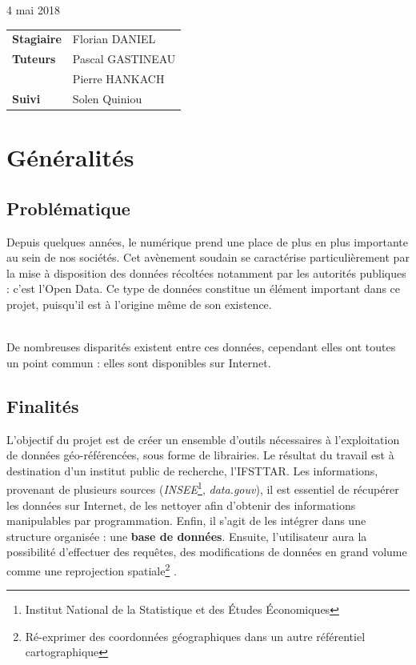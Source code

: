 \documentclass[french,12pt]{report}
\begin{document}
\begin{normalsize}
\begin{center}
4 mai 2018\\
\vspace{3cm}
\begin{tabular}{ll}
\textbf{Stagiaire} & Florian DANIEL \\
\textbf{Tuteurs} & Pascal GASTINEAU\\
& Pierre HANKACH \\
\textbf{Suivi} & Solen Quiniou \\
\end{tabular}


\end{center}
 

\tableofcontents


   \chapter{Généralités}
   
   \section{Problématique}
Depuis quelques années, le numérique prend une place de plus en plus importante au sein de nos sociétés. Cet avènement soudain se caractérise particulièrement par la mise à disposition des données récoltées notamment par les autorités publiques : c’est l’Open Data. Ce type de données constitue un élément important dans ce projet, puisqu’il est à l’origine même de son existence. 


\noindent \\De nombreuses disparités existent entre ces données, cependant elles ont toutes un point commun : elles sont disponibles sur Internet.


   \section{Finalités}


L’objectif du projet est de créer un ensemble d’outils nécessaires à l’exploitation de données géo-référencées, sous forme de librairies. Le résultat du travail est à destination d’un institut public de recherche, l’IFSTTAR. 
Les informations, provenant de plusieurs sources (\textit{INSEE}\footnote{Institut National de la Statistique et des Études Économiques}, \textit{data.gouv}), il est essentiel de récupérer les données sur Internet, de les nettoyer afin d’obtenir des informations manipulables par programmation. Enfin, il s’agit de les intégrer dans une structure organisée : une \textbf{base de données}.  Ensuite, l’utilisateur aura la possibilité d’effectuer des requêtes, des modifications de données en grand volume comme une reprojection spatiale\footnote{Ré-exprimer des coordonnées géographiques dans un autre référentiel cartographique} .
\\


\end{normalsize}
\end{document}
